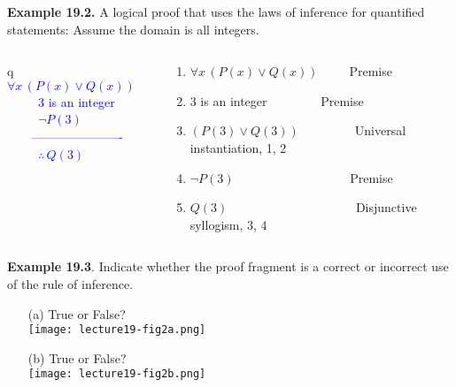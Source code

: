 \documentclass[aspectratio=169]{beamer}
\providecommand{\Blue}[1]{\textcolor{blue}{#1}}
\newcommand\thfore{\mathord{\therefore}\,}
\begin{document}
\begin{frame}[plain]{}
 
 {\bf Example 19.2.} A logical proof that uses the laws of inference for quantified statements:
 Assume the domain is all integers.
 
  \begin{columns}[onlytextwidth]
  \begin{column}{0.3\textwidth}   
   q
   \Blue{
    \ \ \ \ \  $\forall x\, (P(x)\vee Q(x))$  \\
    \ \ \ \ \  3 is an integer\\
    \ \ \ \ \  $\neg P(3)$ \\
    \ \ \ \  ---------------------- \\
    \ \ \ \ \  $\thfore Q(3)$
          }
   \pause 
  \end{column}
  \begin{column}{0.7\textwidth}
     \begin{enumerate}
        \item  $\forall x\, (P(x)\vee Q(x))$\ \ \ \ \ Premise
        \item 3 is an integer \ \ \ \ \ \ \ \ Premise \pause 
        \item $(P(3)\vee Q(3))$\ \ \ \ \ \ \ \ \ Universal instantiation, 1, 2 \pause
        \item $\neg P(3)$ \ \ \ \ \ \ \ \ \ \ \ \ \ \ \ \ \ \ Premise \pause 
        \item $Q(3)$  \ \ \ \ \ \ \ \ \ \ \ \ \ \ \ \ \ \  \ \ Disjunctive syllogism, 3, 4
     \end{enumerate}
  \end{column}

 \end{columns}
   
\end{frame}

\begin{frame}[plain]{}

{\bf Example 19.3}. 
  Indicate whether the proof fragment is a correct or incorrect use of the rule of inference.
    \begin{itemize}
     \item[(a)]  True or False? \\
     \texttt{[image: lecture19-fig2a.png]}
     \item[(b)]   True or False? \\
      \texttt{[image: lecture19-fig2b.png]}
    \end{itemize}
 
 \end{frame}
 
\end{document}
